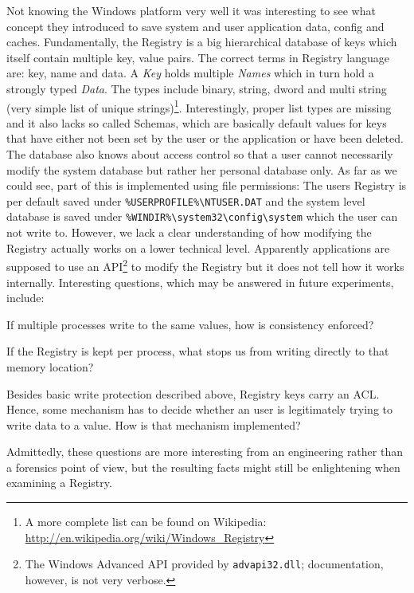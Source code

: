 \documentclass[a4paper,
    11pt,
    normalheadings,
    parindent,
    UKenglish,
    abstracton,
    ]{scrartcl}
\begin{document}
Not knowing the Windows platform very well it was interesting to see what concept they introduced to save system and user application data, config and caches.
Fundamentally, the Registry is a big hierarchical database of keys which itself contain multiple key, value pairs.
The correct terms in Registry language are: key, name and data.
A \emph{Key} holds multiple \emph{Names} which in turn hold a strongly typed \emph{Data}.
The types include
    binary,
    string,
    dword
    and
    multi string (very simple list of unique strings)\footnote{A more complete list can be found on Wikipedia: \url{http://en.wikipedia.org/wiki/Windows_Registry}}.
Interestingly, proper list types are missing and it also lacks so called Schemas, which are basically default values for keys that have either not been set by the user or the application or have been deleted.
The database also knows about access control so that a user cannot necessarily modify the system database but rather her personal database only.
As far as we could see,
part of this is implemented using file permissions: The users Registry is per default saved under \texttt{\%USERPROFILE\%\textbackslash{}NTUSER.DAT} and the system level database is saved under \texttt{\%WINDIR\%\textbackslash{}system32\textbackslash{}config\textbackslash{}system} which the user can not write to.
However, we lack a clear understanding of how modifying the Registry actually works on a lower technical level.
Apparently applications are supposed to use an API\footnote{The Windows Advanced API provided by \texttt{advapi32.dll}; documentation, however, is not very verbose.} to modify the Registry but it does not tell how it works internally.
Interesting questions, which may be answered in future experiments, include:
\begin{inparaitem}
    \item If multiple processes write to the same values, how is consistency enforced?
    \item If the Registry is kept per process, what stops us from writing directly to that memory location?
    \item Besides basic write protection described above, Registry keys carry an ACL.
        Hence, some mechanism has to decide whether an user is legitimately trying to write data to a value.
        How is that mechanism implemented?
\end{inparaitem}
Admittedly, these questions are more interesting from an engineering rather than a forensics point of view, but the resulting facts might still be enlightening when examining a Registry.
\end{document}
